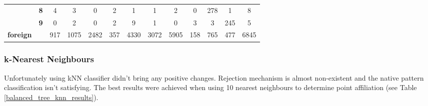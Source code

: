\begin{table}[htp]
{\begin{tabular}{|c|c|c|c|c|c|c|c|c|c|c|c|c|}
		& \textbf{8} & 4          & 3          & 0          & 2          & 1          & 1          & 2          & 0          & 278        & 1          & 8                \\ \cline{2-13} 
		& \textbf{9} & 0          & 2          & 0          & 2          & 9          & 1          & 0          & 3          & 3          & 245        & 5                \\ \hline
		\textbf{foreign}                    & \textbf{}  & 917        & 1075       & 2482       & 357        & 4330       & 3072       & 5905       & 158        & 765        & 477        & 6845             \\ \hline
	\end{tabular}
}
\end{table}

\subsubsection{k-Nearest Neighbours}

Unfortunately using kNN classifier didn't bring any positive changes. Rejection mechanism is almost non-existent and the native pattern classification isn't satisfying. The best results were achieved when using 10 nearest neighbours to determine point affiliation (see Table \ref{balanced_tree_knn_results}).

